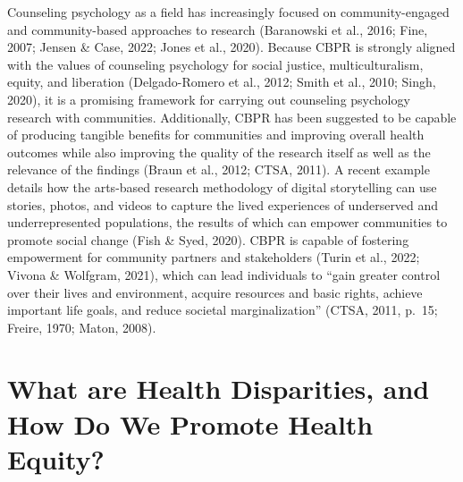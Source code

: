 \documentclass[
  11pt,
]{book}
\begin{document}
Counseling psychology as a field has increasingly focused on community-engaged and community-based approaches to research (Baranowski et al., 2016; Fine, 2007; Jensen \& Case, 2022; Jones et al., 2020). Because CBPR is strongly aligned with the values of counseling psychology for social justice, multiculturalism, equity, and liberation (Delgado-Romero et al., 2012; Smith et al., 2010; Singh, 2020), it is a promising framework for carrying out counseling psychology research with communities. Additionally, CBPR has been suggested to be capable of producing tangible benefits for communities and improving overall health outcomes while also improving the quality of the research itself as well as the relevance of the findings (Braun et al., 2012; CTSA, 2011). A recent example details how the arts-based research methodology of digital storytelling can use stories, photos, and videos to capture the lived experiences of underserved and underrepresented populations, the results of which can empower communities to promote social change (Fish \& Syed, 2020). CBPR is capable of fostering empowerment for community partners and stakeholders (Turin et al., 2022; Vivona \& Wolfgram, 2021), which can lead individuals to ``gain greater control over their lives and environment, acquire resources and basic rights, achieve important life goals, and reduce societal marginalization'' (CTSA, 2011, p.~15; Freire, 1970; Maton, 2008).

\section{What are Health Disparities, and How Do We Promote Health Equity?}\label{what-are-health-disparities-and-how-do-we-promote-health-equity}
\end{document}
